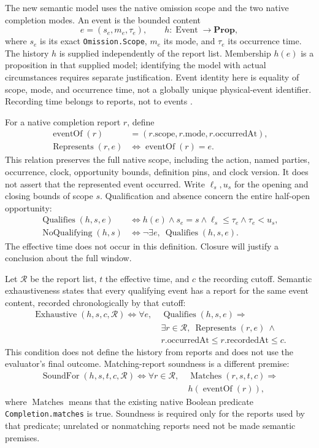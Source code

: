 \documentclass[11pt]{article}
\newcommand{\op}[1]{\operatorname{#1}}
\begin{document}
The new semantic model uses the native omission scope and the two native completion modes. An event is the bounded content
\[
 e=(s_e,m_e,\tau_e),\qquad
 h:\op{Event}\to\mathbf{Prop},
\]
where \(s_e\) is its exact \texttt{Omission.Scope}, \(m_e\) its mode, and \(\tau_e\) its occurrence time. The history \(h\) is supplied independently of the report list. Membership \(h(e)\) is a proposition in that supplied model; identifying the model with actual circumstances requires separate justification. Event identity here is equality of scope, mode, and occurrence time, not a globally unique physical-event identifier. Recording time belongs to reports, not to events \cite{omission-semantics}.

For a native completion report \(r\), define
\[
\begin{aligned}
 \op{eventOf}(r)&=(r.\mathrm{scope},r.\mathrm{mode},r.\mathrm{occurredAt}),\\
 \op{Represents}(r,e)&\iff\op{eventOf}(r)=e.
\end{aligned}
\]
This relation preserves the full native scope, including the action, named parties, occurrence, clock, opportunity bounds, definition pins, and clock version. It does not assert that the represented event occurred. Write \(\ell_s,u_s\) for the opening and closing bounds of scope \(s\). Qualification and absence concern the entire half-open opportunity:
\[
\begin{aligned}
 \op{Qualifies}(h,s,e)&\iff
 h(e)\land s_e=s\land\ell_s\le\tau_e\land\tau_e<u_s,\\
 \op{NoQualifying}(h,s)&\iff
 \neg\exists e,\ \op{Qualifies}(h,s,e).
\end{aligned}
\]
The effective time does not occur in this definition. Closure will justify a conclusion about the full window.

Let \(\mathcal R\) be the report list, \(t\) the effective time, and \(c\) the recording cutoff. Semantic exhaustiveness states that every qualifying event has a report for the same event content, recorded chronologically by that cutoff:
\[
\begin{split}
 \op{Exhaustive}(h,s,c,\mathcal R)\iff
 \forall e,\ &\op{Qualifies}(h,s,e)\Rightarrow\\
 &\exists r\in\mathcal R,\ \op{Represents}(r,e)\ \land\\
 &r.\mathrm{occurredAt}\le r.\mathrm{recordedAt}\le c.
\end{split}
\]
This condition does not define the history from reports and does not use the evaluator's final outcome. Matching-report soundness is a different premise:
\[
\begin{split}
 \op{SoundFor}(h,s,t,c,\mathcal R)\iff
 \forall r\in\mathcal R,\ &\op{Matches}(r,s,t,c)\Rightarrow\\
 &h(\op{eventOf}(r)),
\end{split}
\]
where \(\op{Matches}\) means that the existing native Boolean predicate \texttt{Completion.matches} is true. Soundness is required only for the reports used by that predicate; unrelated or nonmatching reports need not be made semantic premises.
\end{document}
